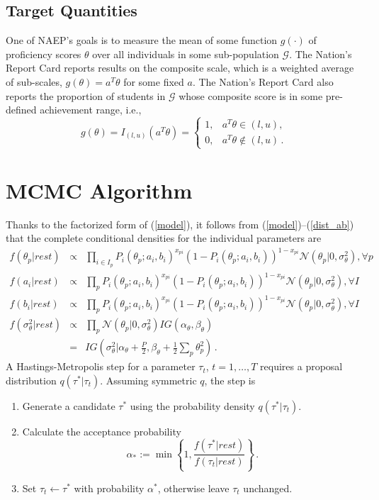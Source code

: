 \documentclass{article}
\newcommand{\Normal}{\mathcal{N}}
\newcommand{\G}{\mathcal{G}}
\newcommand{\st}{\sigma_{\ta}^2}
\newcommand{\ta}{\theta}
\begin{document}
\subsection{Target Quantities}
One of NAEP's goals is to measure the mean of some function $g(\cdot)$ of proficiency scores $\ta$ over all individuals in some sub-population $\G$. The Nation's Report Card reports results on the composite scale, which is a weighted average of sub-scales, $g(\ta) = a^T \ta$ for some fixed $a$. The Nation's Report Card also reports the proportion of students in $\G$ whose composite score is in some pre-defined achievement range, i.e.,
\begin{equation}
	g(\ta) = I_{(l,u)}(a^T \ta) =
  \begin{cases}
    1, & a^T \ta \in (l,u), \\
    0, & a^T \ta \not \in (l,u)\,.
  \end{cases}
\end{equation}

\section{MCMC Algorithm}
Thanks to the factorized form of (\ref{model}), it follows from (\ref{model})--(\ref{dist_ab}) that the complete conditional densities for the individual parameters are
\begin{eqnarray}
  f(\ta_p|rest) &\propto& \prod_{i \in I_p} 
  P_i(\ta_p;a_i,b_i)^{x_{pi}} 
  \left(1 - P_i(\ta_p;a_i,b_i)\right)^{1-x_{pi}} 
  \Normal(\ta_p|0,\st),\forall p\,
  \label{cond_ta}
  \\
  f(a_i|rest) &\propto& \prod_{p} 
  P_i(\ta_p;a_i,b_i)^{x_{pi}} 
  \left(1 - P_i(\ta_p;a_i,b_i)\right)^{1-x_{pi}} 
  \Normal(\ta_p|0,\st),\forall I\,
  \label{cond_a}
  \\
  f(b_i|rest) &\propto& \prod_{p} 
  P_i(\ta_p;a_i,b_i)^{x_{pi}} 
  \left(1 - P_i(\ta_p;a_i,b_i)\right)^{1-x_{pi}} 
  \Normal(\ta_p|0,\st),\forall I\,
  \label{cond_b}
  \\
  f(\st|rest) &\propto& \prod_{p} 
  \Normal(\ta_p|0,\st) IG(\alpha_{\ta},\beta_{\ta}) \\
  &=& IG\left(\st|\alpha_{\ta} + \frac{P}{2}, \beta_{\ta} + \frac12 \sum_p \ta_p^2\right)\,.
  \label{cond_st}
\end{eqnarray}
A Hastings-Metropolis step for a parameter $\tau_t$, $t=1,\dots,T$ requires a proposal distribution $q(\tau^*|\tau_t)$. Assuming symmetric $q$, the step is
\begin{enumerate}
	\item Generate a candidate $\tau^*$ using the probability density $q(\tau^*|\tau_t)$.
	\item Calculate the acceptance probability
	\begin{equation}
		\alpha_* := \min\left\{1, \frac{f(\tau^*|rest)}{f(\tau_t|rest)} \right\}\,.
	\end{equation}
	\item Set $\tau_t \leftarrow \tau^*$ with probability $\alpha^*$, otherwise leave $\tau_t$ unchanged.
\end{enumerate}
\end{document}
